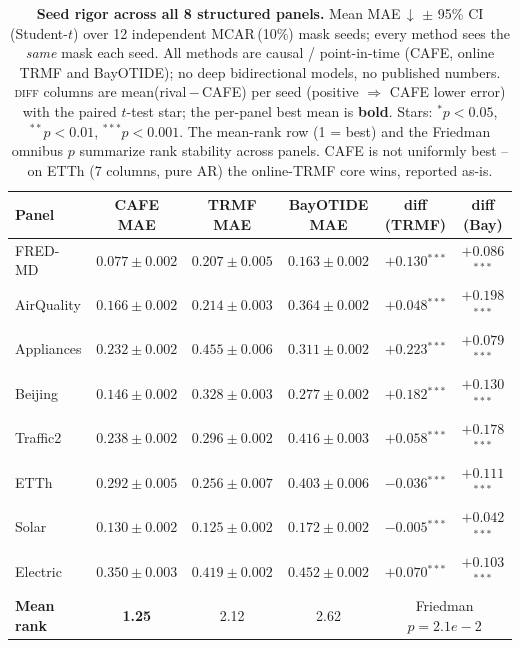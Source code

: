 \begin{table}[t]\centering\small
\setlength{\tabcolsep}{4pt}
\caption{\textbf{Seed rigor across all 8 structured panels.} Mean MAE\,$\downarrow$ $\pm$ 95\% CI (Student-$t$) over 12 independent MCAR\,(10\%) mask seeds; every method sees the \emph{same} mask each seed. All methods are causal / point-in-time (CAFE, online TRMF and BayOTIDE); no deep bidirectional models, no published numbers. \textsc{diff} columns are mean(rival\,$-$\,CAFE) per seed (positive $\Rightarrow$ CAFE lower error) with the paired $t$-test star; the per-panel best mean is \textbf{bold}. Stars: $^{*}p{<}0.05$, $^{**}p{<}0.01$, $^{***}p{<}0.001$. The mean-rank row (1 = best) and the Friedman omnibus $p$ summarize rank stability across panels. CAFE is not uniformly best -- on ETTh (7 columns, pure AR) the online-TRMF core wins, reported as-is.}
\label{tab:seedsfull}
\begin{tabular}{@{}lccccc@{}}
\toprule
Panel & CAFE MAE & TRMF MAE & BayOTIDE MAE & diff (TRMF) & diff (Bay) \\
\midrule
FRED-MD & \textbf{$0.077\pm0.002$} & $0.207\pm0.005$ & $0.163\pm0.002$ & $+0.130$$^{***}$ & $+0.086$$^{***}$ \\
AirQuality & \textbf{$0.166\pm0.002$} & $0.214\pm0.003$ & $0.364\pm0.002$ & $+0.048$$^{***}$ & $+0.198$$^{***}$ \\
Appliances & \textbf{$0.232\pm0.002$} & $0.455\pm0.006$ & $0.311\pm0.002$ & $+0.223$$^{***}$ & $+0.079$$^{***}$ \\
Beijing & \textbf{$0.146\pm0.002$} & $0.328\pm0.003$ & $0.277\pm0.002$ & $+0.182$$^{***}$ & $+0.130$$^{***}$ \\
Traffic2 & \textbf{$0.238\pm0.002$} & $0.296\pm0.002$ & $0.416\pm0.003$ & $+0.058$$^{***}$ & $+0.178$$^{***}$ \\
ETTh & $0.292\pm0.005$ & \textbf{$0.256\pm0.007$} & $0.403\pm0.006$ & $-0.036$$^{***}$ & $+0.111$$^{***}$ \\
Solar & $0.130\pm0.002$ & \textbf{$0.125\pm0.002$} & $0.172\pm0.002$ & $-0.005$$^{***}$ & $+0.042$$^{***}$ \\
Electric & \textbf{$0.350\pm0.003$} & $0.419\pm0.002$ & $0.452\pm0.002$ & $+0.070$$^{***}$ & $+0.103$$^{***}$ \\
\midrule
\textbf{Mean rank} & \textbf{1.25} & 2.12 & 2.62 & \multicolumn{2}{c}{Friedman $p=2.1e-2$} \\
\bottomrule
\end{tabular}
\end{table}
